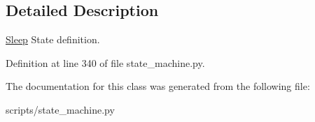 \subsection{Detailed Description}
\hyperlink{classstate__machine_1_1Sleep}{Sleep} State definition. 

Definition at line 340 of file state\+\_\+machine.\+py.



The documentation for this class was generated from the following file\+:\begin{DoxyCompactItemize}
\item 
scripts/state\+\_\+machine.\+py\end{DoxyCompactItemize}
